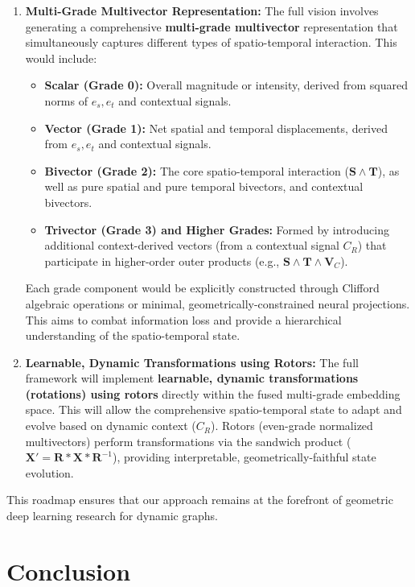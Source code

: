 \documentclass[11pt]{article}
\begin{document}
\begin{itemize}
\begin{enumerate}
    \item \textbf{Multi-Grade Multivector Representation:} The full vision involves generating a comprehensive \textbf{multi-grade multivector} representation that simultaneously captures different types of spatio-temporal interaction. This would include:
        \begin{itemize}
            \item \textbf{Scalar (Grade 0):} Overall magnitude or intensity, derived from squared norms of $e_s, e_t$ and contextual signals.
            \item \textbf{Vector (Grade 1):} Net spatial and temporal displacements, derived from $e_s, e_t$ and contextual signals.
            \item \textbf{Bivector (Grade 2):} The core spatio-temporal interaction ($\mathbf{S} \wedge \mathbf{T}$), as well as pure spatial and pure temporal bivectors, and contextual bivectors.
            \item \textbf{Trivector (Grade 3) and Higher Grades:} Formed by introducing additional context-derived vectors (from a contextual signal $C_R$) that participate in higher-order outer products (e.g., $\mathbf{S} \wedge \mathbf{T} \wedge \mathbf{V}_C$).
        \end{itemize}
        Each grade component would be explicitly constructed through Clifford algebraic operations or minimal, geometrically-constrained neural projections. This aims to combat information loss and provide a hierarchical understanding of the spatio-temporal state.

    \item \textbf{Learnable, Dynamic Transformations using Rotors:} The full framework will implement \textbf{learnable, dynamic transformations (rotations) using rotors} directly within the fused multi-grade embedding space. This will allow the comprehensive spatio-temporal state to adapt and evolve based on dynamic context ($C_R$). Rotors (even-grade normalized multivectors) perform transformations via the sandwich product ($\mathbf{X}' = \mathbf{R} * \mathbf{X} * \mathbf{R}^{-1}$), providing interpretable, geometrically-faithful state evolution.

\end{enumerate}
This roadmap ensures that our approach remains at the forefront of geometric deep learning research for dynamic graphs.

\section{Conclusion}


\end{itemize}
\end{document}
